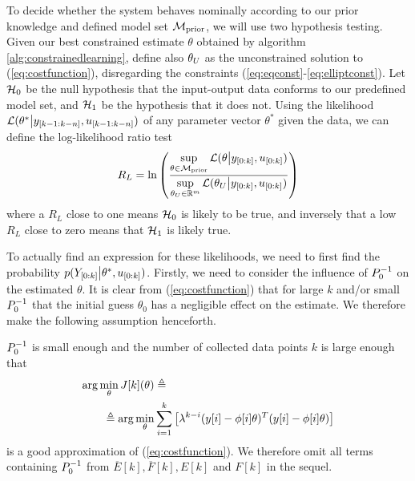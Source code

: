 
To decide whether the system behaves nominally according to our prior knowledge and
defined model set $\mathcal{M}_{\text{prior}}$, we will use two hypothesis testing.
Given our best constrained estimate $\theta$ obtained by algorithm \ref{alg:constrainedlearning},
define also $\theta_{U}$ as the unconstrained solution to (\ref{eq:costfunction}), disregarding
the constraints (\ref{eq:eqconst}-\ref{eq:elliptconst}).
Let $\mathcal{H}_0$ be the null hypothesis that the input-output data conforms to our predefined model set,
and $\mathcal{H}_1$ be the hypothesis that it does not.
Using the likelihood $\mathcal{L}(\theta^* \big{\vert} y_{[k-1:k-n]}, u_{[k-1:k-n]})$
of any parameter vector $\theta^*$ given the data, we can define the
log-likelihood ratio test
\begin{equation}
    R_L = \ln\left(\frac{\sup\limits_{\theta \in \mathcal{M}_{\text{prior}}}
    \mathcal{L}(\theta \big{\vert} y_{[0:k]}, u_{[0:k]})}
    {\sup\limits_{\theta_{U} \in \mathbb{R}^m}
    \mathcal{L}(\theta_{U} \big{\vert} y_{[0:k]}, u_{[0:k]})}\right)
\end{equation}
where a $R_L$ close to one means  $\mathcal{H}_0$ is likely to be true, and
inversely that a low $R_L$ close to zero means that $\mathcal{H}_1$ is likely true.

To actually find an expression for these likelihoods, we need to first find the probability
$p(Y_{[0:k]}\big{|}\theta^*, u_{[0:k]})$. Firstly, we need to consider the influence
of $P_0^{-1}$ on the estimated $\theta$. It is clear from (\ref{eq:costfunction})
that for large $k$ and/or small $P_0^{-1}$ that the initial guess $\theta_0$
has a negligible effect on the estimate. We therefore make the following
assumption henceforth.
\begin{assumption}
    \label{ass:smallP0}
    $P_0^{-1}$ is small enough and the number of collected
    data points $k$ is large enough that
    \begin{equation}
        \begin{aligned}
            \arg\min\limits_{\theta} J[k](\theta) &\triangleq \notag
        \\ \triangleq \arg\min\limits_{\theta} &
            \sum\limits_{i=1}^k \left[
            \lambda^{k-i}(y[i]-\phi[i]\theta)^T(y[i]-\phi[i]\theta) \right]
        \end{aligned}
    \end{equation}
    is a good approximation of (\ref{eq:costfunction}). We therefore
    omit all terms containing $P_0^{-1}$ from $\overline{E}[k],
    \overline{F}[k], E[k]$ and $F[k]$ in the sequel.
\end{assumption}

